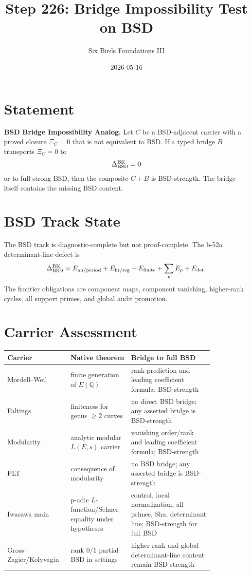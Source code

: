 \documentclass{article}
\title{Step 226: Bridge Impossibility Test on BSD}
\author{Six Birds Foundations III}
\date{2026-05-16}
\begin{document}
\maketitle

\section{Statement}

\textbf{BSD Bridge Impossibility Analog.}
Let \(C\) be a BSD-adjacent carrier with a proved closure \(\Xi_C=0\) that is not equivalent to BSD. If a typed bridge \(B\) transports \(\Xi_C=0\) to
\[
\Delta_{\rm BSD}^{\rm BK}=0
\]
or to full strong BSD, then the composite \(C+B\) is BSD-strength. The bridge itself contains the missing BSD content.

\section{BSD Track State}

The BSD track is diagnostic-complete but not proof-complete. The b-52a determinant-line defect is
\[
\Delta_{\rm BSD}^{\rm BK}
=
E_{\rm an/period}
+E_{\rm ht/reg}
+E_{\rm finite}
+\sum_p E_p
+E_{\rm det}.
\]
The frontier obligations are component maps, component vanishing, higher-rank cycles, all support primes, and global audit promotion.

\section{Carrier Assessment}

\begin{tabular}{p{0.22\linewidth}p{0.26\linewidth}p{0.36\linewidth}}
\toprule
Carrier & Native theorem & Bridge to full BSD\\
\midrule
Mordell--Weil & finite generation of \(E(\mathbb Q)\) & rank prediction and leading coefficient formula; BSD-strength\\
Faltings & finiteness for genus \(\ge 2\) curves & no direct BSD bridge; any asserted bridge is BSD-strength\\
Modularity & analytic modular \(L(E,s)\) carrier & vanishing order/rank and leading coefficient formula; BSD-strength\\
FLT & consequence of modularity & no BSD bridge; any asserted bridge is BSD-strength\\
Iwasawa main & p-adic \(L\)-function/Selmer equality under hypotheses & control, local normalization, all primes, Sha, determinant line; BSD-strength for full BSD\\
Gross--Zagier/Kolyvagin & rank \(0/1\) partial BSD in settings & higher rank and global determinant-line content remain BSD-strength\\
\bottomrule
\end{tabular}
\end{document}
